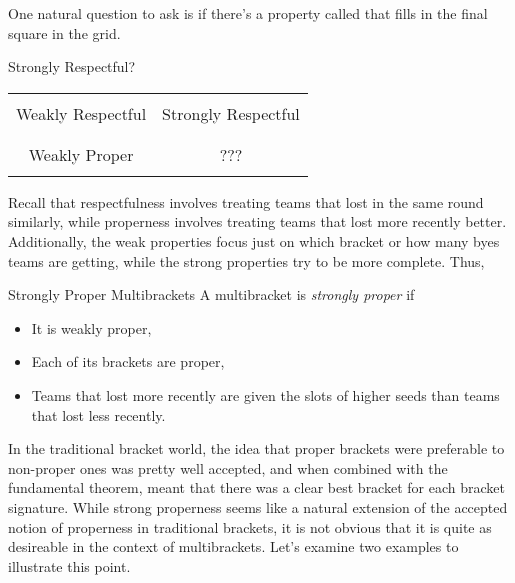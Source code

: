 {    One natural question to ask is if there's a property called that fills in the final square in the grid.

    \begin{figg}{Strongly Respectful?}{}
        \begin{center}
            \begin{tabular}{ | c | c |}
            \hline
            & \\
            Weakly Respectful & Strongly Respectful\\
            & \\
            \hline
            & \\
            Weakly Proper & ??? \\
            & \\
            \hline
            \end{tabular}
        \end{center}
    \end{figg}

    Recall that respectfulness involves treating teams that lost in the same round similarly, while properness involves treating teams that lost more recently better. Additionally, the weak properties focus just on which bracket or how many byes teams are getting, while the strong properties try to be more complete. Thus,

    \begin{definition}{Strongly Proper Multibrackets}{}
        A multibracket is \textit{strongly proper} if
        \begin{itemize}
            \item It is weakly proper,
            \item Each of its brackets are proper,
            \item Teams that lost more recently are given the slots of higher seeds than teams that lost less recently.
        \end{itemize}
    \end{definition}

    In the traditional bracket world, the idea that proper brackets were preferable to non-proper ones was pretty well accepted, and when combined with the fundamental theorem, meant that there was a clear best bracket for each bracket signature. While strong properness seems like a natural extension of the accepted notion of properness in traditional brackets, it is not obvious that it is quite as desireable in the context of multibrackets. Let's examine two examples to illustrate this point.
    
}
